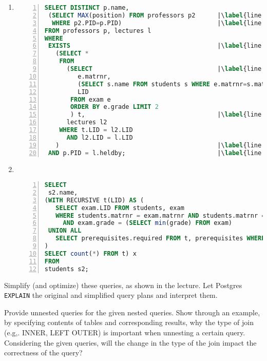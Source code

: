 \begin{enumerate}
  \item \begin{lstlisting}[language=sql,numbers=left, stepnumber=1, numberstyle = \tiny,escapechar=|]
SELECT DISTINCT p.name,
 (SELECT MAX(position) FROM professors p2      |\label{line:max_prof}|
  WHERE p2.PID=p.PID)                          |\label{line:max_prof_2}|
FROM professors p, lectures l
WHERE 
 EXISTS                                        |\label{line:start_exist}|
   (SELECT *
    FROM
      (SELECT                                  |\label{line:start_simplify}|
         e.matrnr,
         (SELECT s.name FROM students s WHERE e.matrnr=s.matrnr),
         LID
       FROM exam e
       ORDER BY e.grade LIMIT 2
       ) t,                                    |\label{line:end_simplify}|
      lectures l2
    WHERE t.LID = l2.LID
      AND l2.LID = l.LID
   )                                           |\label{line:end_exist}|
 AND p.PID = l.heldby;                         |\label{line:outer_p_o_joinpred}| \end{lstlisting}

  \item \
        \begin{lstlisting}[language=sql,numbers=left, stepnumber=1, numberstyle = \tiny]
SELECT
 s2.name,
(WITH RECURSIVE t(LID) AS (
   SELECT exam.LID FROM students, exam
   WHERE students.matrnr = exam.matrnr AND students.matrnr = s2.matrnr
     AND exam.grade = (SELECT min(grade) FROM exam)
 UNION ALL
   SELECT prerequisites.required FROM t, prerequisites WHERE t.LID = prerequisites.lecture
)
SELECT count(*) FROM t) x
FROM
students s2;\end{lstlisting}
\end{enumerate}

Simplify (and optimize) these queries, as shown in the lecture.
Let Postgres \verb+EXPLAIN+ the original and simplified query plans and interpret them.

\newpage


Provide unnested queries for the given nested queries. Show through an example, by specifying contents of tables and corresponding results, why the type of join (e.g,. INNER, LEFT OUTER) is important when unnesting a certain query. Considering the given queries, will the change in the type of the join impact the correctness of the query?

